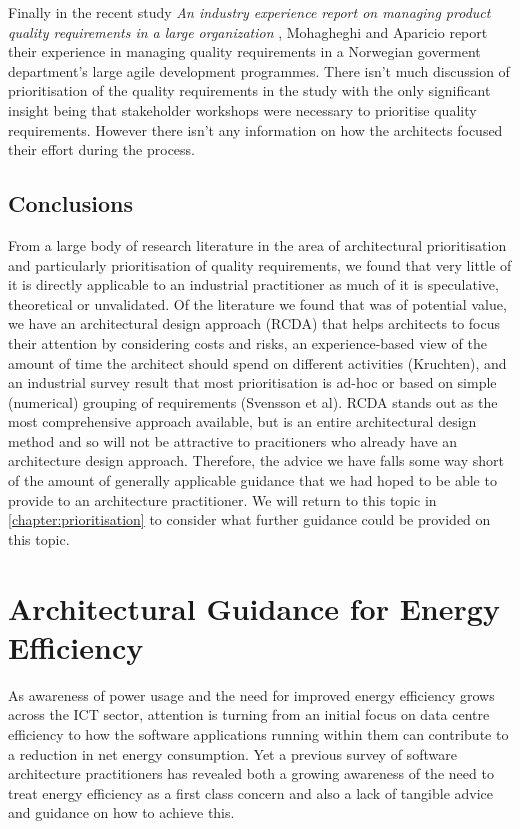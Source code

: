 Finally in the recent study \emph{An industry experience report on managing product quality requirements in a large organization} \cite{mohagheghi2017-managingqr}, Mohagheghi and Aparicio report their experience in managing quality requirements in a Norwegian goverment department's large agile development programmes.  There isn't much discussion of prioritisation of the quality requirements in the study with the only significant insight being that stakeholder workshops were necessary to prioritise quality requirements.  However there isn't any information on how the architects focused their effort during the process.

\subsection{Conclusions}

From a large body of research literature in the area of architectural prioritisation and particularly prioritisation of quality requirements, we found that very little of it is directly applicable to an industrial practitioner as much of it is speculative, theoretical or unvalidated.  Of the literature we found that was of potential value, we have an architectural design approach (RCDA) that helps architects to focus their attention by considering costs and risks, an experience-based view of the amount of time the architect should spend on different activities (Kruchten), and an industrial survey result that most prioritisation is ad-hoc or based on simple (numerical) grouping of requirements (Svensson et al).  RCDA stands out as the most comprehensive approach available, but is an entire architectural design method and so will not be attractive to pracitioners who already have an architecture design approach.  Therefore, the advice we have falls some way short of the amount of generally applicable guidance that we had hoped to be able to provide to an architecture practitioner.  We will return to this topic in \cref{chapter:prioritisation} to consider what further guidance could be provided on this topic.


\section{Architectural Guidance for Energy Efficiency}
\label{section:litreview-energyguidance}


As awareness of power usage and the need for improved energy efficiency grows across the ICT sector, attention is turning from an initial focus on data centre efficiency \cite{delforge2014-datacentreenergy} to how the software applications running within them can contribute to a reduction in net energy consumption.  Yet a previous survey of software architecture practitioners \cite{bashroush2016-datacentreenergy} has revealed both a growing awareness of the need to treat energy efficiency as a first class concern and also a lack of tangible advice and guidance on how to achieve this.

